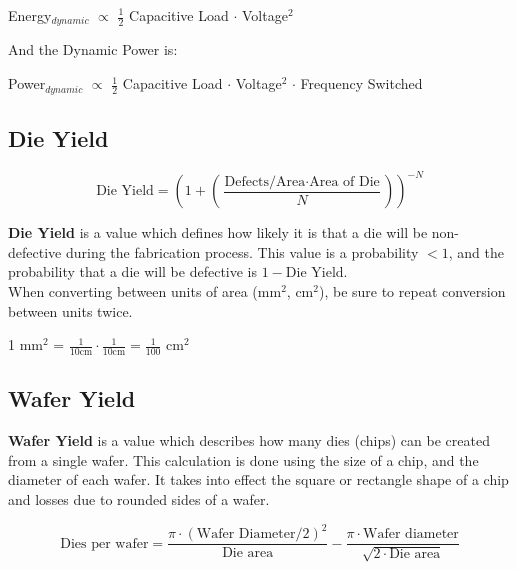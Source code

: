 \documentclass[11pt]{article}
\begin{document}
\begin{center}
    Energy$_{dynamic}$ $\propto$ $\frac{1}{2}$ Capacitive Load $\cdot$ Voltage$^2$
\end{center}

And the Dynamic Power is:

\begin{center}
    Power$_{dynamic}$ $\propto$ $\frac{1}{2}$ Capacitive Load $\cdot$ Voltage$^2$ $\cdot$ Frequency Switched
\end{center}

\subsection{Die Yield}

\begin{center}
    \begin{equation}
    \text{Die Yield} = (1 + (\frac{\text{Defects/Area} \cdot \text{Area of Die}}{N}))^{-N}
    \end{equation}
\end{center}

\textbf{Die Yield} is a value which defines how likely it is that a die will be non-defective during the fabrication process. This value is a probability $< 1$, and the probability that a die will be defective is $1 - $Die Yield. \\
When converting between units of area (mm$^2$, cm$^2$), be sure to repeat conversion between units twice.

\begin{center}
    1 mm$^2$ = $\frac{1}{10 \text{cm}} \cdot \frac{1}{10 \text{cm}} = \frac{1}{100}$ cm$^2$
\end{center}

\subsection{Wafer Yield}

\textbf{Wafer Yield} is a value which describes how many dies (chips) can be created from a single wafer. This calculation is done using the size of a chip, and the diameter of each wafer. It takes into effect the square or rectangle shape of a chip and losses due to rounded sides of a wafer.

\begin{center}
\begin{equation} \text{Dies per wafer} = 
    \frac{\pi \cdot (\text{Wafer Diameter}/2)^2}{\text{Die area}} - \frac{\pi \cdot \text{Wafer diameter}}{\sqrt{2 \cdot \text{Die area}}}    
\end{equation}
\end{center}
\end{document}
